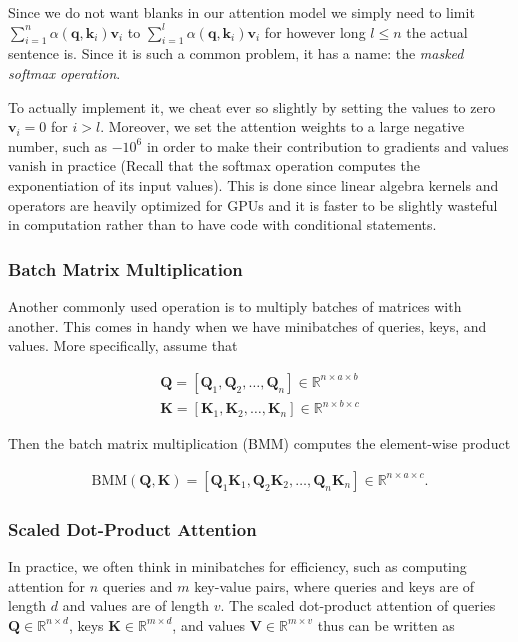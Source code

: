\documentclass[a4paper,12pt]{article}
\theoremstyle{definition}
\begin{document}
Since we do not want blanks in our attention model we simply need to limit $\sum_{i=1}^n \alpha(\mathbf{q}, \mathbf{k}_i) \mathbf{v}_i$ to
$\sum_{i=1}^l \alpha(\mathbf{q}, \mathbf{k}_i) \mathbf{v}_i$
for however long $l \leq n$ the actual sentence is. Since it is such a common problem, it has a name: the \emph{masked softmax operation}.

To actually implement it, we cheat ever so slightly by setting the values to zero $\mathbf{v}_i = 0$ for $i > l$. Moreover, we set the attention weights to a large negative number,
such as $-10^6$ in order to make their contribution to gradients and values vanish in practice (Recall that the softmax operation computes the exponentiation of its input values).
This is done since linear algebra kernels and operators are heavily optimized for GPUs and it is faster to be slightly wasteful in computation rather than to have code with conditional statements.

\subsubsection*{Batch Matrix Multiplication}
Another commonly used operation is to multiply batches of matrices with another. This comes in handy when we have minibatches of queries, keys, and values. More specifically, assume that

\begin{align*}
    \mathbf{Q} = [\mathbf{Q}_1, \mathbf{Q}_2, \ldots, \mathbf{Q}_n]  \in \mathbb{R}^{n \times a \times b} \\
    \mathbf{K} = [\mathbf{K}_1, \mathbf{K}_2, \ldots, \mathbf{K}_n]  \in \mathbb{R}^{n \times b \times c}
\end{align*}

Then the batch matrix multiplication (BMM) computes the element-wise product

\begin{align*}
    \mathrm{BMM}(\mathbf{Q}, \mathbf{K}) = [\mathbf{Q}_1 \mathbf{K}_1, \mathbf{Q}_2 \mathbf{K}_2, \ldots, \mathbf{Q}_n \mathbf{K}_n] \in \mathbb{R}^{n \times a \times c}.
\end{align*}


\subsubsection*{Scaled Dot-Product Attention}
In practice, we often think in minibatches for efficiency, such as computing attention for $n$ queries and $m$ key-value pairs, where queries and keys are of length $d$
and values are of length $v$. The scaled dot-product attention of queries $\mathbf Q\in\mathbb R^{n\times d}$, keys $\mathbf K\in\mathbb R^{m\times d}$,
and values $\mathbf V\in\mathbb R^{m\times v}$ thus can be written as
\end{document}
